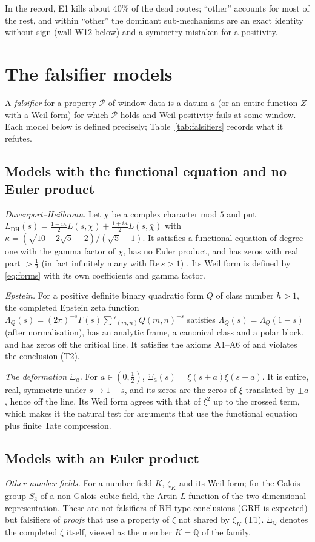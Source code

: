 \documentclass[11pt]{amsart}
\theoremstyle{definition}
\theoremstyle{remark}
\newcommand{\Q}{\mathbb Q}
\newcommand{\Rel}{\mathrm{Re}\,}
\begin{document}
In the record, E1 kills about 40\% of the dead routes; ``other'' accounts for most of the rest, and
within ``other'' the dominant sub-mechanisms are an exact identity without sign (wall W12 below) and
a symmetry mistaken for a positivity.

\section{The falsifier models}\label{sec:falsifiers}

A \emph{falsifier} for a property $\mathscr P$ of window data is a datum $a$ (or an entire function
$Z$ with a Weil form) for which $\mathscr P$ holds and Weil positivity fails at some window. Each model
below is defined precisely; Table~\ref{tab:falsifiers} records what it refutes.

\subsection{Models with the functional equation and no Euler product}
\emph{Davenport--Heilbronn.} Let $\chi$ be a complex character mod $5$ and put
$L_{\mathrm{DH}}(s)=\frac{1-i\kappa}2L(s,\chi)+\frac{1+i\kappa}2L(s,\bar\chi)$ with
$\kappa=(\sqrt{10-2\sqrt5}-2)/(\sqrt5-1)$. It satisfies a functional equation of degree one with the
gamma factor of $\chi$, has no Euler product, and has zeros with real part $>\frac12$ (in fact
infinitely many with $\Rel s>1$) \cite{DavenportHeilbronn1936}. Its Weil form is defined by
\eqref{eq:forms} with its own coefficients and gamma factor.

\emph{Epstein.} For a positive definite binary quadratic form $Q$ of class number $h>1$, the completed
Epstein zeta function $\Lambda_Q(s)=(2\pi)^{-s}\Gamma(s)\sum'_{(m,n)}Q(m,n)^{-s}$ satisfies
$\Lambda_Q(s)=\Lambda_Q(1-s)$ (after normalisation), has an analytic frame, a canonical class and a
polar block, and has zeros off the critical line. It satisfies the axioms A1--A6 of \cite[\S18]{Paper46}
and violates the conclusion (T2).

\emph{The deformation $\Xi_a$.} For $a\in(0,\frac12)$, $\Xi_a(s)=\xi(s+a)\xi(s-a)$. It is entire, real,
symmetric under $s\mapsto1-s$, and its zeros are the zeros of $\xi$ translated by $\pm a$, hence off
the line. Its Weil form agrees with that of $\xi^2$ up to the crossed term, which makes it the natural
test for arguments that use the functional equation plus finite Tate compression.

\subsection{Models with an Euler product}
\emph{Other number fields.} For a number field $K$, $\zeta_K$ and its Weil form; for the Galois group
$S_3$ of a non-Galois cubic field, the Artin $L$-function of the two-dimensional representation. These
are not falsifiers of RH-type conclusions (GRH is expected) but falsifiers of \emph{proofs} that use a
property of $\zeta$ not shared by $\zeta_K$ (T1). $\Xi_\Q$ denotes the completed $\zeta$ itself, viewed as
the member $K=\Q$ of the family.
\end{document}
